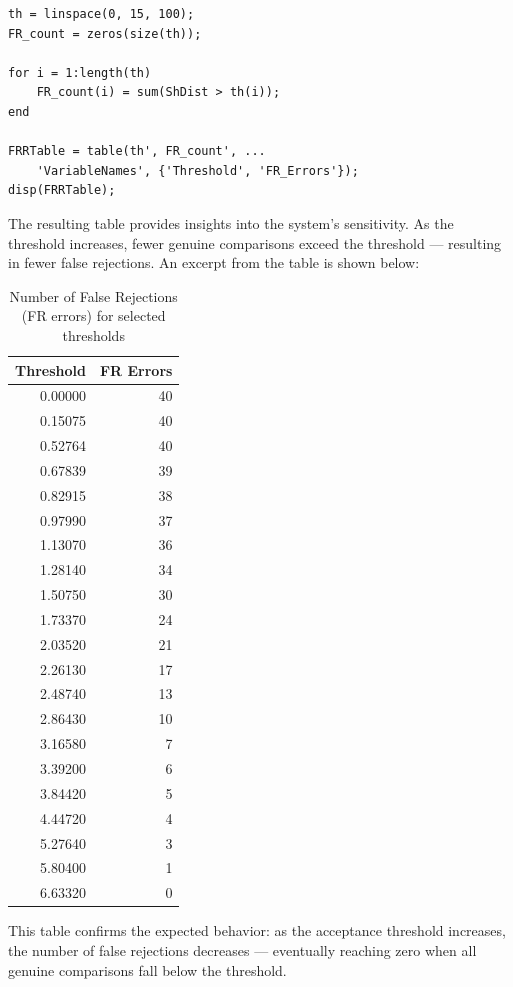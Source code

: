 \documentclass[a4paper,12pt]{article}
\begin{document}
\begin{verbatim}
th = linspace(0, 15, 100);
FR_count = zeros(size(th));

for i = 1:length(th)
    FR_count(i) = sum(ShDist > th(i));
end

FRRTable = table(th', FR_count', ...
    'VariableNames', {'Threshold', 'FR_Errors'});
disp(FRRTable);
\end{verbatim}

\vspace{0.5em}
\noindent
The resulting table provides insights into the system's sensitivity. As the threshold increases, fewer genuine comparisons exceed the threshold — resulting in fewer false rejections. An excerpt from the table is shown below:

\vspace{1em}
\begin{table}[H]
\centering
\begin{tabular}{@{}rr@{}}
\toprule
\textbf{Threshold} & \textbf{FR Errors} \\
\midrule
0.00000  & 40 \\
0.15075  & 40 \\
0.52764  & 40 \\
0.67839  & 39 \\
0.82915  & 38 \\
0.97990  & 37 \\
1.13070  & 36 \\
1.28140  & 34 \\
1.50750  & 30 \\
1.73370  & 24 \\
2.03520  & 21 \\
2.26130  & 17 \\
2.48740  & 13 \\
2.86430  & 10 \\
3.16580  & 7 \\
3.39200  & 6 \\
3.84420  & 5 \\
4.44720  & 4 \\
5.27640  & 3 \\
5.80400  & 1 \\
6.63320  & 0 \\
\bottomrule
\end{tabular}
\caption{Number of False Rejections (FR errors) for selected thresholds}
\label{tab:fr_errors_vs_threshold}
\end{table}

\vspace{0.5em}
\noindent
This table confirms the expected behavior: as the acceptance threshold increases, the number of false rejections decreases — eventually reaching zero when all genuine comparisons fall below the threshold.
\end{document}
